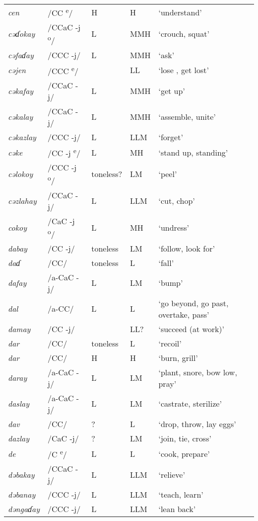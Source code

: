 \begin{small}
\begin{longtable}{lp{1.75cm}p{1.75cm}p{1.75cm}p{3cm}}
\textit{cen} & /CC \textsuperscript{e}/ & H & H & ‘understand’\\
\textit{cəɗokay} & /CCaC -j\textsuperscript{ o}/ & L & MMH & ‘crouch, squat’\\
\textit{cəfaɗay} & /CCC -j/ & L & MMH & ‘ask’\\
\textit{cəjen} & /CCC \textsuperscript{e}/ &  & LL & ‘lose , get lost’\\
\textit{cəkafay} & /CCaC -j/ & L & MMH & ‘get up’\\
\textit{cəkalay} & /CCaC -j/ & L & MMH & ‘assemble, unite’\\
\textit{cəkazlay} & /CCC -j/ & L & LLM & ‘forget’\\
\textit{cəke} & /CC -j \textsuperscript{e}/ & L & MH & ‘stand up, standing’\\
\textit{cəlokoy} & /CCC -j\textsuperscript{ o}/ & toneless? & LM & ‘peel’\\
\textit{cəzlahay} & /CCaC -j/ & L & LLM & ‘cut, chop’\\
\textit{cokoy} & /CaC -j\textsuperscript{ o}/ & L & MH & ‘undress’\\
\textit{dabay} & /CC -j/ & toneless & LM & ‘follow, look for’\\
\textit{daɗ} & /CC/ & toneless & L & ‘fall’\\
\textit{dafay} & /a-CaC -j/ & L & LM & ‘bump’\\
\textit{dal} & /a-CC/ & L & L & ‘go beyond, go past, overtake, pass’\\
\textit{damay} & /CC -j/ &  & LL? & ‘succeed (at work)’\\
\textit{dar} & /CC/ & toneless & L & ‘recoil’\\
\textit{dar} & /CC/ & H & H & ‘burn, grill’\\
\textit{daray} & /a-CaC -j/ & L & LM & ‘plant, snore, bow low, pray’\\
\textit{daslay} & /a-CaC -j/ & L & LM & ‘castrate, sterilize’\\
\textit{dav} & /CC/ & ? & L & ‘drop, throw, lay eggs’\\
\textit{dazlay} & /CaC -j/ & ? & LM & ‘join, tie, cross’\\
\textit{de} & /C \textsuperscript{e}/ & L & L & ‘cook, prepare’\\
\textit{dəbakay} & /CCaC -j/ & L & LLM & ‘relieve’\\
\textit{dəbanay} & /CCC -j/ & L & LLM & ‘teach, learn’\\
\textit{dəngaɗay} & /CCC -j/ & L & LLM & ‘lean back’\\

\end{longtable}
\end{small}
